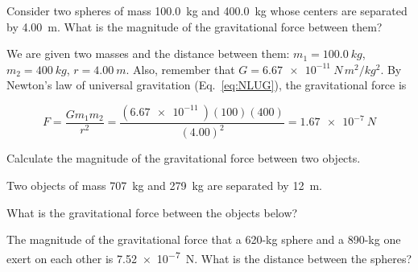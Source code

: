 \documentclass[dvipsnames]{article}
\numberwithin{equation}{section}
\numberwithin{figure}{section}
\begin{document}
\begin{example}
Consider two spheres of mass \SI{100.0}{kg} and \SI{400.0}{kg} whose centers are separated by \SI{4.00}{m}. What is the magnitude of the gravitational force between them?
\vspace{1ex}

\Solution We are given two masses and the distance between them: $m_1 = \SI{100.0}{kg}$, $m_2 = \SI{400}{kg}$, $r = \SI{4.00}{m}$. Also, remember that $G = \SI{6.67e-11}{N\,m^2/kg^2}$. By Newton's law of universal gravitation (Eq.~\ref{eq:NLUG}), the gravitational force is

\begin{equation*}
    F = \frac{G m_1 m_2}{r^2} = 
    \frac{\left(\SI{6.67e-11}{}\right) \left(100\right) \left(400\right)}{\left(4.00\right)^2} = 
    \SI{1.67e-7}{N}
\end{equation*}
\end{example}

\cyanhrule
\vspace{2ex}

Calculate the magnitude of the gravitational force between two objects.

\begin{exercise} \label{9DkhbB}
Two objects of mass \SI{707}{kg} and \SI{279}{kg} are separated by \SI{12}{m}. 
\end{exercise}



\begin{exercise} \label{MMnbpt}
What is the gravitational force between the objects below?
\vspace{-2em}

\begin{center}
    \centering
\end{center}
\end{exercise}

\begin{example}
    The magnitude of the gravitational force that a 620-kg sphere and a 890-kg one exert on each other is \SI{7.52e-7}{N}. What is the distance between the spheres?
\end{example}
\end{document}
